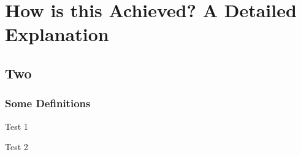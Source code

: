\chapter{How is this Achieved? A Detailed Explanation}
\section{Two}


\subsection{Some Definitions}
\begin{definition}
	Test 1
\end{definition}
\begin{fact}
	Test 2
\end{fact}
